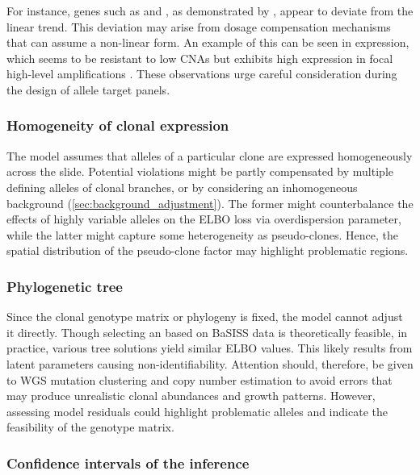 For instance, genes such as  and , as demonstrated by \textcite{Shao2019-vq}, appear to deviate from the linear trend. This deviation may arise from dosage compensation mechanisms that can assume a non-linear form. An example of this can be seen in  expression, which seems to be resistant to low \acp{CNA} but exhibits high expression in focal high-level amplifications \parencite{Schukken2022-jm}. These observations urge careful consideration during the design of allele target panels.

\subsubsection*{Homogeneity of clonal expression}
The model assumes that alleles of a particular clone are expressed homogeneously across the slide. Potential violations might be partly compensated by multiple defining alleles of clonal branches, or by considering an inhomogeneous background (\cref{sec:background_adjustment}). The former might counterbalance the effects of highly variable alleles on the \ac{ELBO} loss via overdispersion parameter, while the latter might capture some heterogeneity as pseudo-clones. Hence, the spatial distribution of the pseudo-clone factor may highlight problematic regions. 

\subsubsection*{Phylogenetic tree}
Since the clonal genotype matrix or phylogeny is fixed, the model cannot adjust it directly. Though selecting an  based on \ac{BaSISS} data is theoretically feasible, in practice, various tree solutions yield similar \ac{ELBO} values. This likely results from latent parameters causing non-identifiability. Attention should, therefore, be given to \ac{WGS} mutation clustering and copy number estimation to avoid errors that may produce unrealistic clonal abundances and growth patterns. However, assessing model residuals could highlight problematic alleles and indicate the feasibility of the genotype matrix.

\subsubsection*{Confidence intervals of the inference}

